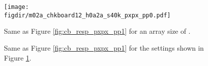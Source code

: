 



\begin{figure}[!h]
	\centering
	\texttt{[image: \\figdir/m02a\_chkboard12\_h0a2a\_s40k\_pxpx\_pp0.pdf]}
	\caption[Same as Figure \ref{fig:cb_resp_pxpx_pp1} for small arrays]{Same as Figure \ref{fig:cb_resp_pxpx_pp1} for an array size of .}
	\label{fig:model3d_setting_pp0}
\end{figure}

\begin{figure}[t]
	\centering
	\caption{Same as Figure \ref{fig:cb_resp_pxpx_pp1} for the settings shown in Figure \ref{fig:model3d_setting_pp0}.}
	\label{fig:cb_resp_pxpx_pp0}
\end{figure}
